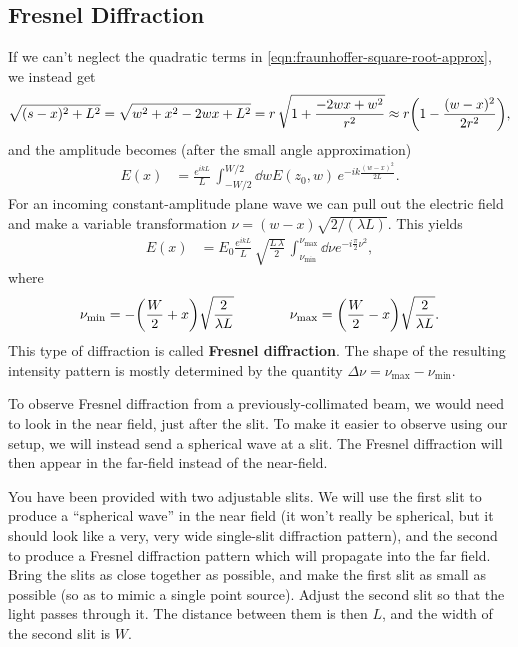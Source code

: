 \documentclass[]{manual}
\begin{document}
    \subsection{Fresnel Diffraction}
    If we can't neglect the quadratic terms in \eqref{eqn:fraunhoffer-square-root-approx}, we instead get
    \begin{align} \label{eqn:fresnel-square-root-approx}
        \sqrt{(s-x)^2 + L^2} = \sqrt{w^2 + x^2 - 2wx + L^2} = r \, \sqrt{1 + \frac{-2wx + w^2}{r^2}} \approx r \qty(1 - \frac{(w-x)^2}{2r^2}),
    \end{align}
    and the amplitude becomes (after the small angle approximation)
    \begin{align} \label{eqn:fresnel-diffraction-integral}
        E(x) &= \frac{e^{i k L}}{L} \, \int^{W/2}_{-W/2} \dd{w} E(z_0, w) \, e^{-i k \frac{(w-x)^2}{2L}}.
    \end{align}
    For an incoming constant-amplitude plane wave we can pull out the electric field and make a variable transformation $\nu = (w-x) \sqrt{2/(\lambda L)}$.
    This yields
    \begin{align} \label{eqn:fresnel-diffraction}
        E(x) &= E_0 \frac{e^{i k L}}{L} \, \sqrt{\frac{L \, \lambda}{2}} \, \int^{\nu_{\mathrm{max}}}_{\nu_{\mathrm{min}}} \dd{\nu} e^{-i \frac{\pi}{2} \nu^2},
    \end{align}
    where
    \begin{align}
        \nu_{\mathrm{min}} = -\qty(\frac{W}{2} + x) \sqrt{\frac{2}{\lambda L}}
        \qquad \qquad
        \nu_{\mathrm{max}} = \qty(\frac{W}{2} - x) \sqrt{\frac{2}{\lambda L}}.
    \end{align}
    This type of diffraction is called \textbf{Fresnel diffraction}.
    The shape of the resulting intensity pattern is mostly determined by the quantity $\Delta \nu = \nu_{\mathrm{max}} - \nu_{\mathrm{min}}$.

    To observe Fresnel diffraction from a previously-collimated beam, we would need to look in the near field, just after the slit.
    To make it easier to observe using our setup, we will instead send a spherical wave at a slit.
    The Fresnel diffraction will then appear in the far-field instead of the near-field.

    You have been provided with two adjustable slits.
    We will use the first slit to produce a ``spherical wave'' in the near field (it won't really be spherical, but it should look like a very, very wide single-slit diffraction pattern), and the second to produce a Fresnel diffraction pattern which will propagate into the far field.
    Bring the slits as close together as possible, and make the first slit as small as possible (so as to mimic a single point source).
    Adjust the second slit so that the light passes through it.
    The distance between them is then $L$, and the width of the second slit is $W$.
\end{document}
